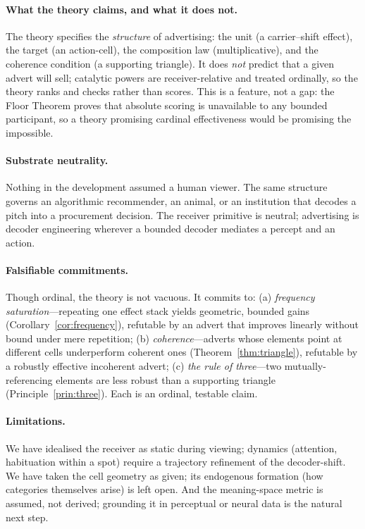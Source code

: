 \documentclass[twocolumn,11pt,a4paper]{article}
\theoremstyle{adv}
\theoremstyle{definition}
\theoremstyle{remark}
\begin{document}
\paragraph{What the theory claims, and what it does not.}
The theory specifies the \emph{structure} of advertising: the unit (a
carrier--shift effect), the target (an action-cell), the composition law
(multiplicative), and the coherence condition (a supporting triangle). It
does \emph{not} predict that a given advert will sell; catalytic powers are
receiver-relative and treated ordinally, so the theory ranks and checks
rather than scores. This is a feature, not a gap: the Floor Theorem proves
that absolute scoring is unavailable to any bounded participant, so a
theory promising cardinal effectiveness would be promising the impossible.

\paragraph{Substrate neutrality.}
Nothing in the development assumed a human viewer. The same structure
governs an algorithmic recommender, an animal, or an institution that
decodes a pitch into a procurement decision. The receiver primitive is
neutral; advertising is decoder engineering wherever a bounded decoder
mediates a percept and an action.

\paragraph{Falsifiable commitments.}
Though ordinal, the theory is not vacuous. It commits to:
(a) \emph{frequency saturation}---repeating one effect stack yields
geometric, bounded gains (Corollary~\ref{cor:frequency}), refutable by an
advert that improves linearly without bound under mere repetition;
(b) \emph{coherence}---adverts whose elements point at different cells
underperform coherent ones (Theorem~\ref{thm:triangle}), refutable by a
robustly effective incoherent advert; (c) \emph{the rule of three}---two
mutually-referencing elements are less robust than a supporting triangle
(Principle~\ref{prin:three}). Each is an ordinal, testable claim.

\paragraph{Limitations.}
We have idealised the receiver as static during viewing; dynamics
(attention, habituation within a spot) require a trajectory refinement of
the decoder-shift. We have taken the cell geometry as given; its
endogenous formation (how categories themselves arise) is left open. And
the meaning-space metric is assumed, not derived; grounding it in
perceptual or neural data is the natural next step.
\end{document}
